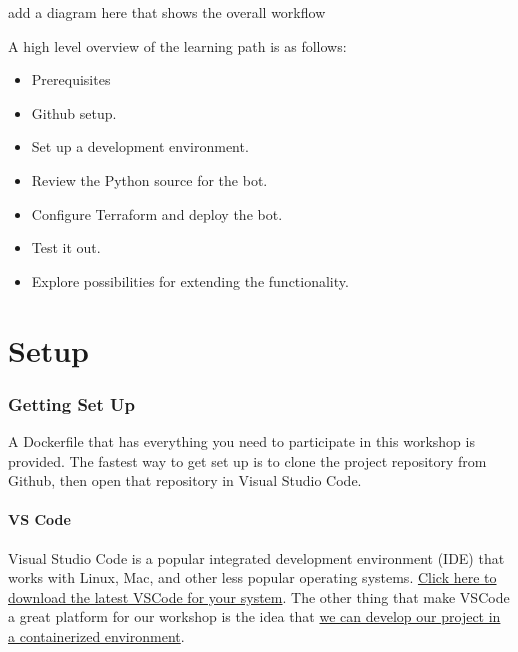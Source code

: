 add a diagram here that shows the overall workflow

\justifying
A high level overview of the learning path is as follows:

\begin{raggedright}
	\begin{itemize}
		\item Prerequisites
		\item Github setup.
		\item Set up a development environment.
		\item Review the Python source for the bot.
		\item Configure Terraform and deploy the bot.
		\item Test it out.
		\item Explore possibilities for extending the functionality.
	\end{itemize}
\end{raggedright}
\vspace{2mm}

\clearpage
\part{Setup}

\section{\label{sec:preparation}Getting Set Up}

\justifying
A Dockerfile that has everything you need to participate in this workshop is provided. The fastest way to get set up is to clone the project 
repository from Github, then open that repository in Visual Studio Code.
\vspace{2mm}

\subsection{\label{sec:dev-linux}VS Code}

\justifying
Visual Studio Code is a popular integrated development environment (IDE) that works with Linux, Mac, and other less popular operating
systems. \href{https://code.visualstudio.com/download}{Click here to download the latest VSCode for your system}. The other thing that
make VSCode a great platform for our workshop is the idea that \href{https://code.visualstudio.com/docs/devcontainers/containers}{we can develop our project in a containerized environment}.
\vspace{2mm}

